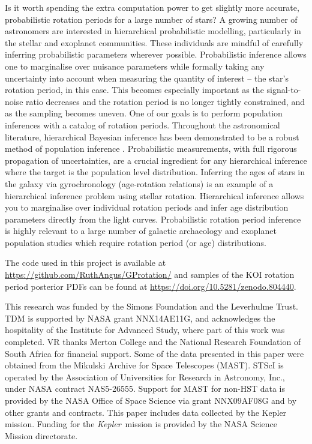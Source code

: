 \documentclass[a4paper,fleqn,usenatbib,useAMS]{mnras}
\newcommand{\Kepler}{{\it Kepler}}
\newcommand{\eg}{{\it e.g.}}
\begin{document}
{Is it worth spending the extra computation power to get slightly more
accurate, probabilistic rotation periods for a large number of stars?
A growing number of astronomers are interested in hierarchical probabilistic
modelling, particularly in the stellar and exoplanet communities.
These individuals are mindful of carefully inferring probabilistic parameters
wherever possible.
Probabilistic inference allows one to marginalise over nuisance
parameters while formally taking any uncertainty into account when
measuring the quantity of interest -- the star's rotation period, in
this case.
This becomes especially important as the signal-to-noise ratio
decreases and the rotation period is no longer tightly constrained,
and as the sampling becomes uneven.
One of our goals is to perform population inferences with a catalog of
rotation periods.
Throughout the astronomical literature, hierarchical Bayesian
inference has been demonstrated to be a robust method of population
inference \citep[\eg][]{Hogg2010, Foremanmackey2015, Wolfgang2015, Rogers2015}.
Probabilistic measurements, with full rigorous propagation of
uncertainties, are a crucial ingredient for any hierarchical inference
where the target is the population level distribution.
Inferring the ages of stars in the galaxy via gyrochronology (age-rotation
relations) \citep[\eg][]{Skumanich1972, Kawaler1989, Barnes2003, Barnes2007}
is an example of a hierarchical inference problem using stellar rotation.
Hierarchical inference allows you to marginalise over individual rotation
periods and infer age distribution parameters directly from the light curves.
Probabilistic rotation period inference is highly relevant to a large number
of galactic archaeology and exoplanet population studies which require
rotation period (or age) distributions.}

The code used in this project is available at
\url{https://github.com/RuthAngus/GProtation/} and samples of the KOI rotation
period posterior PDFs can be found at
\url{https://doi.org/10.5281/zenodo.804440}.

This research was funded by the Simons Foundation and the Leverhulme Trust.
TDM is supported by NASA grant NNX14AE11G, and acknowledges the
hospitality of the Institute for Advanced Study,
where part of this work was completed.
VR thanks Merton College and the National Research Foundation of South Africa
for financial support.
Some of the data presented in this paper were obtained from the Mikulski
Archive for Space Telescopes (MAST).
STScI is operated by the Association of Universities for Research in
Astronomy, Inc., under NASA contract NAS5-26555.
Support for MAST for non-HST data is provided by the NASA Office of Space
Science via grant NNX09AF08G and by other grants and contracts.
This paper includes data collected by the Kepler mission. Funding for the
\Kepler\ mission is provided by the NASA Science Mission directorate.



\end{document}
